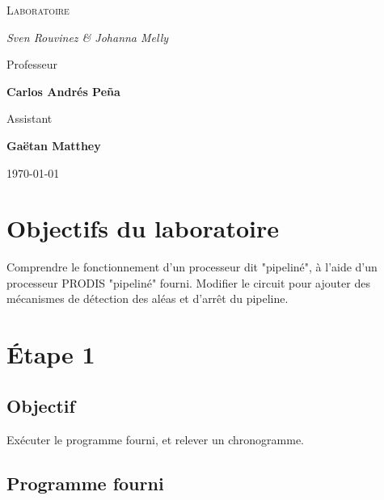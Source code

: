 \documentclass[a4paper]{article} %
\begin{document}
\renewcommand{\labelitemi}{$\bullet$}
\renewcommand{\labelitemii}{$\cdot$}
\renewcommand{\labelitemiii}{$\diamond$}
\renewcommand{\labelitemiv}{$\ast$}

\begin{titlepage}
	\centering
	
	{\scshape\LARGE \color{Monokaimagenta} Laboratoire \\  \par}
	
	\vspace{1cm}
	
	{\Large\itshape Sven Rouvinez \& Johanna Melly\par}
	
	\vfill
	Professeur\par
	\textbf{Carlos Andrés Peña} \par%
	\vspace{1cm}
	Assistant\par
	\textbf{Gaëtan Matthey}
	
	\vfill

	{\large \today\par}
	
\end{titlepage}

\section{Objectifs du laboratoire}
Comprendre le fonctionnement d'un processeur dit "pipeliné", à l'aide d'un processeur PRODIS "pipeliné" fourni. Modifier le circuit pour ajouter des mécanismes de détection des aléas et d'arrêt du pipeline.
\section{Étape 1}
\subsection{Objectif}
Exécuter le programme fourni, et relever un chronogramme.
\subsection{Programme fourni}

\end{document}
